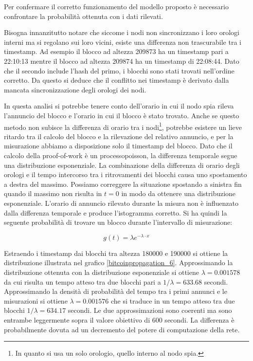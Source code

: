 Per confermare il corretto funzionamento del modello proposto è necessario confrontare la probabilità ottenuta con i dati rilevati.

Bisogna innanzitutto notare che siccome i nodi non sincronizzano i loro orologi interni ma si regolano sui loro vicini, esiste una differenza non trascurabile tra i timestamp. Ad esempio il blocco ad altezza 209873 ha un timestamp pari a 22:10:13 mentre il blocco ad altezza 209874 ha un timestamp di 22:08:44. Dato che il secondo include l'hash del primo, i blocchi sono stati trovati nell'ordine corretto. Da questo si deduce che il conflitto nei timestamp è derivato dalla mancata sincronizzazione degli orologi dei nodi.

In questa analisi si potrebbe tenere conto dell'orario in cui il nodo spia rileva l'annuncio del blocco e l'orario in cui il blocco è stato trovato. Anche se questo metodo non subisce la differenza di orario tra i nodi\footnote{In quanto si usa un solo orologio, quello interno al nodo spia.}, potrebbe esistere un lieve ritardo tra il calcolo del blocco e la rilevazione del relativo annuncio, e per la misurazione abbiamo a disposizione solo il timestamp del blocco. Dato che il calcolo della proof-of-work è un \gls{processopoisson}, la differenza temporale segue una distribuzione esponenziale. La combinazione della differenza di orario degli orologi e il tempo intercorso tra i ritrovamenti dei blocchi causa uno spostamento a destra del massimo. Possiamo correggere la situazione spostando a sinistra fin quando il massimo non risulta in $t=0$ in modo da ottenere una distribuzione esponenziale. L'orario di annuncio rilevato durante la misura non è influenzato dalla differenza temporale e produce l'istogramma corretto. Si ha quindi la seguente probabilità di trovare un blocco durante l'intervallo di misurazione:

\[ g(t) = \lambda e^{-\lambda \cdot x}\]

Estraendo i timestamp dai blocchi tra altezza 180000 e 190000 si ottiene la distribuzione illustrata nel grafico \ref{bitcoinpropagation_6}. Approssimando la distribuzione ottenuta con la distribuzione esponenziale si ottiene $\lambda = 0.001578$ da cui risulta un tempo atteso tra due blocchi pari a $1 / \lambda = 633.68$ secondi. Approssimando la densità di probabilità del tempo tra i primi annunci e le misurazioni si ottiene $\lambda = 0.001576$ che si traduce in un tempo atteso tra due blocchi $1/ \lambda = 634.17$ secondi. Le due approssimazioni sono coerenti ma sono entrambe leggermente sopra il valore obiettivo di 600 secondi. La differenza è probabilmente dovuta ad un decremento del potere di computazione della rete.

